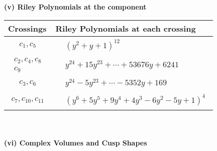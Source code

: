 \documentclass[1p]{elsarticle_modified}
\theoremstyle{definition}
\begin{document}
\newpage\renewcommand{\arraystretch}{1}
\flushleft \textbf{(v) Riley Polynomials at the component}\newline \\
\begin{tabular}{m{50pt}|m{274pt}}
Crossings & \hspace{64pt}Riley Polynomials at each crossing \\
\hline $$\begin{aligned}c_{1},c_{5}\end{aligned}$$&$\begin{aligned}
&(y^2+y+1)^{12}
\end{aligned}$\\
\hline $$\begin{aligned}c_{2},c_{4},c_{8}\\c_{9}\end{aligned}$$&$\begin{aligned}
&y^{24}+15 y^{23}+\cdots+53676 y+6241
\end{aligned}$\\
\hline $$\begin{aligned}c_{3},c_{6}\end{aligned}$$&$\begin{aligned}
&y^{24}-5 y^{23}+\cdots-5352 y+169
\end{aligned}$\\
\hline $$\begin{aligned}c_{7},c_{10},c_{11}\end{aligned}$$&$\begin{aligned}
&(y^6+5 y^5+9 y^4+4 y^3-6 y^2-5 y+1)^4
\end{aligned}$\\
\hline
\end{tabular}\\~\\
\newpage\flushleft \textbf{(vi) Complex Volumes and Cusp Shapes}
\end{document}
